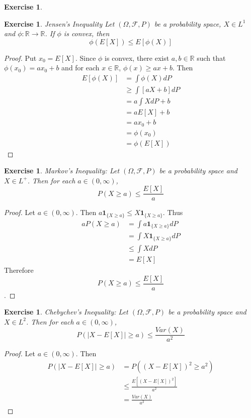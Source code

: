 \documentclass[12pt]{amsart}
\newtheorem{ex}[thm]{Exercise}
\newcommand{\Om}{\Omega}
\newcommand{\R}{\mathbb{R}}
\newcommand{\MF}{\mathcal{F}}
\begin{document}
\begin{ex}
	
\end{ex}

\begin{ex}{Jensen's Inequality}
	Let $(\Om, \MF, P)$ be a probability space, $X \in L^1$ and $\phi:\R \rightarrow \R$. If $\phi$ is convex, then $$\phi(E[X]) \leq E[\phi(X)]$$
\end{ex}

\begin{proof}
	Put $x_0 = E[X]$. Since $\phi$ is convex, there exist $a,b \in \R$ such that $\phi(x_0) = ax_0+b$ and for each $x \in \R$, $\phi(x) \geq ax+b$. Then \begin{align*}
		E[\phi(X)] 
		&= \int\phi(X) dP \\
		&\geq \int[ aX+b ]dP \\
		&= a\int X dP +b \\
		&= aE[X] +b \\
		&= ax_0+b \\
		&= \phi(x_0) \\
		&= \phi(E[X])
	\end{align*}
\end{proof}

\begin{ex}{Markov's Inequality:}
	Let $(\Om, \MF, P)$ be a probability space and $X \in L^+$. Then for each $a \in (0,\infty)$, $$P(X \geq a) \leq \frac{E[X]}{a}$$
\end{ex}

\begin{proof}
	Let $a \in (0,\infty)$. Then $a \mathbf{1}_{\{X \geq a\}} \leq X \mathbf{1}_{\{X \geq a\}}$. Thus 
	\begin{align*}
		a P(X \geq a) 
		&= \int a \mathbf{1}_{\{X \geq a\}} dP\\
		&= \int X \mathbf{1}_{\{X \geq a\}} dP\\
		&\leq \int X dP \\
		&= E[X]
	\end{align*}
	Therefore $$P(X \geq a) \leq \frac{E[X]}{a}$$. 
\end{proof}

\begin{ex}{Chebychev's Inequality:}
	Let $(\Om, \MF, P)$ be a probability space and $X \in L^2$. Then for each $a \in (0, \infty)$, $$P(\vert X - E[X] \vert \geq a) \leq \frac{Var(X)}{a^2}$$
\end{ex}

\begin{proof}
	Let $a \in (0, \infty)$. Then 
	\begin{align*}
		P(\vert X - E[X] \vert \geq a) 
		&= P((X - E[X])^2 \geq a^2) \\
		&\leq \frac{E[(X - E[X])^2]}{a^2} \\
		&= \frac{Var(X)}{a^2}  
	\end{align*}
\end{proof}
\end{document}
